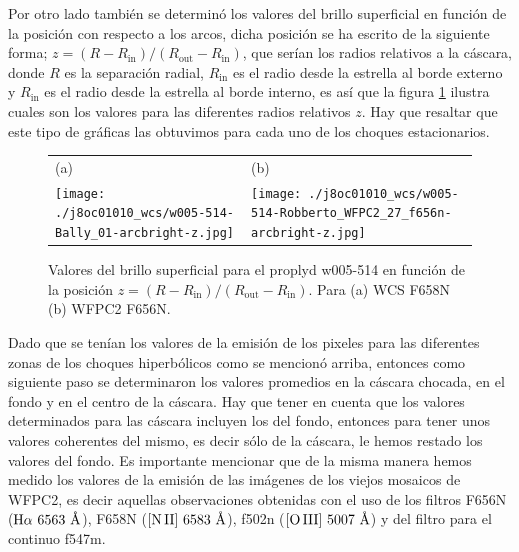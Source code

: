 Por otro lado también se determinó los valores del brillo superficial en función de la posición con respecto a los arcos, dicha posición se ha escrito de la siguiente forma; \(z = (R - R_{\text{in}})/(R_{\text{out}} - R_{\text{in}})\), que serían los radios relativos a la cáscara, donde \(R\) es la separación radial, \(R_{\text{in}}\) es el radio  desde la estrella al borde externo y \(R_{\text{in}}\) es el radio desde  la estrella al borde interno, es así que la figura \ref{fig:brillo-z} ilustra cuales son los valores para las diferentes radios relativos \(z\). Hay que resaltar que este tipo de gráficas las obtuvimos para cada uno de los choques estacionarios.\\

\begin{figure}[htp]
\centering
\begin{tabular}{l l}
(a) & (b)  \\
  \texttt{[image: ./j8oc01010\_wcs/w005-514-Bally\_01-arcbright-z.jpg]}
& \texttt{[image: ./j8oc01010\_wcs/w005-514-Robberto\_WFPC2\_27\_f656n-arcbright-z.jpg]}\\
\end{tabular}
\caption{Valores del brillo superficial para el proplyd w005-514 en función de la posición  \(z = (R - R_{\text{in}})/(R_{\text{out}} - R_{\text{in}})\). Para (a) WCS F658N (b) WFPC2 F656N.}\label{fig:brillo-z}
\end{figure}

Dado que se tenían los valores de la emisión de los pixeles para las diferentes zonas de los choques hiperbólicos como se mencionó arriba, entonces como siguiente paso se determinaron los valores promedios en la cáscara chocada, en el fondo y en el centro de la cáscara. Hay que tener en cuenta que los valores determinados para las cáscara incluyen los del fondo, entonces para tener unos valores coherentes del mismo, es decir sólo de la cáscara, le hemos restado los valores del fondo. Es importante mencionar que de la misma manera hemos medido los valores de la emisión de las  imágenes de los viejos  mosaicos de WFPC2, es decir aquellas  observaciones obtenidas con el uso de los filtros F656N (\(\mathrm{\mathrm{H}\alpha~6563~\text{\AA{}}{}}\)), F658N (\(\mathrm{\mathrm{[N\,II]}~6583~\text{\AA{}}{}}\)), f502n (\(\mathrm{[O\,III]}{}~5007~\text{\AA{}}{}\)) y del filtro para el continuo f547m.\\

